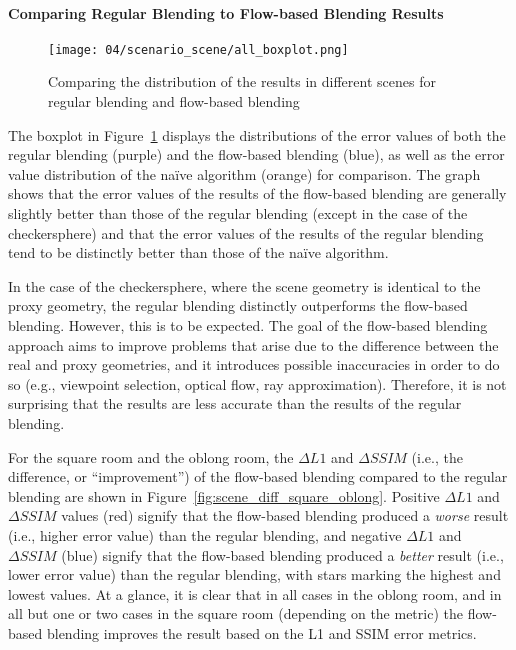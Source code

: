 \paragraph{Comparing Regular Blending to Flow-based Blending Results}

\begin{figure}
		\centering
		\texttt{[image: 04/scenario\_scene/all\_boxplot.png]}
		\caption[The distribution of results in different scenes]{Comparing the distribution of the results in different scenes for regular blending and flow-based blending}
		\label{fig:scenario_scene_boxplot}
\end{figure}

The boxplot in Figure~\ref{fig:scenario_scene_boxplot} displays the distributions of the error values of both the regular blending (purple) and the flow-based blending (blue), as well as the error value distribution of the na\"ive algorithm (orange) for comparison\footnotemark. The graph shows that the error values of the results of the flow-based blending are generally slightly better than those of the regular blending (except in the case of the checkersphere) and that the error values of the results of the regular blending tend to be distinctly better than those of the na\"ive algorithm. 

In the case of the checkersphere, where the scene geometry is identical to the proxy geometry, the regular blending distinctly outperforms the flow-based blending. However, this is to be expected. The goal of the flow-based blending approach aims to improve problems that arise due to the difference between the real and proxy geometries, and it introduces possible inaccuracies in order to do so (e.g., viewpoint selection, optical flow, ray approximation). Therefore, it is not surprising that the results are less accurate than the results of the regular blending.

For the square room and the oblong room, the $\Delta L1$ and $\Delta SSIM$ (i.e., the difference, or ``improvement'') of the flow-based blending compared to the regular blending are shown in Figure~\ref{fig:scene_diff_square_oblong}. Positive $\Delta L1$ and $\Delta SSIM$ values (red) signify that the flow-based blending produced a \emph{worse} result (i.e., higher error value) than the regular blending, and negative $\Delta L1$ and $\Delta SSIM$ (blue) signify that the flow-based blending produced a \emph{better} result (i.e., lower error value) than the regular blending, with stars marking the highest and lowest values. At a glance, it is clear that in all cases in the oblong room, and in all but one or two cases in the square room (depending on the metric) the flow-based blending improves the result based on the L1 and SSIM error metrics.

